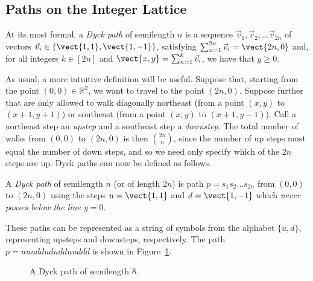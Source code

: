 \documentclass[12pt,twoside]{memoir}
\begin{document}
    \subsection{Paths on the Integer Lattice}
      
      At its most formal, a \emph{Dyck path} of semilength $n$ is a sequence
      $\vec v_1, \vec v_2, \dots \vec v_{2n}$ of vectors $ \vec v_i \in
      \{\vect{1,1}, \vect{1,-1}\}$, satisfying $ \sum_{n=1}^{2n} \vec v_i =
      \vect{2n, 0}$ and, for all integers $k \in [2n]$ and $\vect{x,y} =
      \sum_{n=1}^k \vec v_i$, we have that $y \geq 0$. 

      As usual, a more intuitive definition will be useful. 
      Suppose that, starting from the point $(0,0) \in \mathbb{R}^2$, we want to
      travel to the point $(2n,0)$. Suppose further that are only allowed to walk
      diagonally northeast 
      (from a point $(x,y)$ to $(x+1, y+1)$) or southeast (from a point $(x,y)$
      to $(x+1, y-1)$). 
      Call a northeast step an \emph{upstep} and a southeast step a
      \emph{downstep}. The total number of walks from $(0,0)$ to $(2n,0)$ is then
      $\binom{2n}{n}$, since the number of up steps must equal the number of down
      steps, and so we need only specify which of the $2n$ steps are up. Dyck
      paths can now be defined as follows. 

      \begin{definition}\label{prelim:def:dyckpath}
        A \emph{Dyck path} of semilength $n$ (or of length $2n$) is path $p =
        s_1s_2 \dots s_{2n}$ from $(0,0)$ to $(2n,0)$ using the steps $u =
        \vect{1,1}$ and $d = \vect{1,-1}$ which \emph{never passes below the
        line $y=0$}. 
      \end{definition}

      These paths can be represented as a string of symbols from the alphabet
      $\{u,d\}$, representing upsteps and downsteps, respectively. The path $p =
      uuuddududduuddd$ is shown in Figure~\ref{prelim:fig:dyckpath}. 

      \begin{figure}[t]\centering
        \caption{A Dyck path of semilength $8$.}
        \label{prelim:fig:dyckpath}
      \end{figure}
\end{document}

